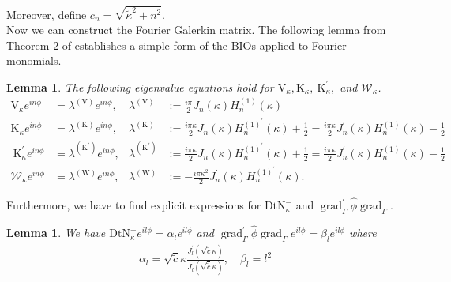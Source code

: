 \documentclass[12pt,journal,compsoc, onecolumn]{IEEEtran}
\newtheorem{lemma}[theorem]{Lemma}
\begin{document}
Moreover, define $c_n = \sqrt{\tilde \kappa^2 + n^2}$.\\
Now we can construct the Fourier Galerkin matrix. 
The following lemma from Theorem 2 of \cite{amini1998preconditioned} establishes a simple form of the BIOs applied to Fourier monomials.
\begin{lemma}
    The following eigenvalue equations hold for $\mathrm{V}_\kappa, \mathrm{K}_\kappa, \mathrm{~K}_{\kappa}^{\prime}, $ and $\mathcal{W}_{\kappa}$.
    $$
    \begin{aligned} 
        \mathrm{V}_{\kappa}e^{i n \phi} &=\lambda^{(\mathrm{V})} e^{i n \phi}, & \lambda^{(\mathrm{V})} &:=\frac{i \pi}{2} J_{n}(\kappa) H_{n}^{(1)}(\kappa) \\ 
        \mathrm{K}_{\kappa}e^{i n \phi} &=\lambda^{(\mathrm{K})} e^{i n \phi}, & \lambda^{(\mathrm{K})} &:=\frac{i \pi \kappa}{2} J_{n}(\kappa) H_{n}^{(1)^{\prime}}(\kappa)+\frac{1}{2}=\frac{i \pi \kappa}{2} J_{n}^{\prime}(\kappa) H_{n}^{(1)}(\kappa)-\frac{1}{2} \\ 
        \mathrm{~K}_{\kappa}^{\prime}e^{i n \phi} &=\lambda^{\left(\mathrm{K}^{\prime}\right)} e^{i n \phi}, & \lambda^{\left(\mathrm{K}^{\prime}\right)} &:=\frac{i \pi \kappa}{2} J_{n}(\kappa) H_{n}^{(1)^{\prime}}(\kappa)+\frac{1}{2}=\frac{i \pi \kappa}{2} J_{n}^{\prime}(\kappa) H_{n}^{(1)}(\kappa)-\frac{1}{2} \\ 
        \mathcal{W}_{\kappa}e^{i n \phi} &=\lambda^{(\mathrm{W})} e^{i n \phi}, & \lambda^{(\mathrm{W})} &:= - \frac{i \pi \kappa^{2}}{2} J_{n}^{\prime}(\kappa) H_{n}^{(1)^{\prime}}(\kappa).
    \end{aligned}
    $$
\end{lemma}
\noindent
Furthermore, we have to find explicit expressions for \(\mathrm{DtN}_{ \kappa}^{-}\) and \(\operatorname{grad}_{\Gamma}^{\prime} \hat{\phi} \operatorname{grad}_{\Gamma}\). 
\begin{lemma}
    We have \(\mathrm{DtN}_{ \kappa}^{-}  e^{il\phi} = \alpha_l  e^{il\phi}\) and \(\operatorname{grad}_{\Gamma}^{\prime} \hat{\phi} \operatorname{grad}_{\Gamma}  e^{il\phi}= \beta_l  e^{il\phi}\) where 
    \begin{align}
        \alpha_l = \sqrt{\tilde c}\kappa \frac{J_l^\prime(\sqrt{\tilde c}\kappa )}{J_l(\sqrt{\tilde c}\kappa)}, \quad \beta_l = l^2
    \end{align}
\end{lemma}
\end{document}

